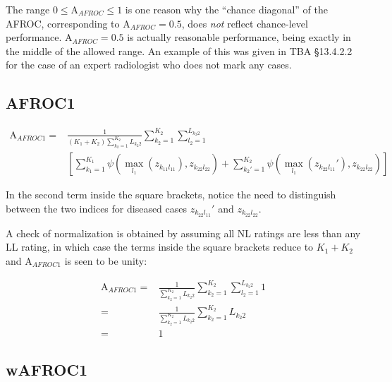\documentclass[
]{book}
\begin{document}
The range \(0 \leq \text{A}_{AFROC} \leq 1\) is one reason why the ``chance diagonal'' of the AFROC, corresponding to \(\text{A}_{AFROC} = 0.5\), does \emph{not} reflect chance-level performance. \(\text{A}_{AFROC} = 0.5\) is actually reasonable performance, being exactly in the middle of the allowed range. An example of this was given in TBA §13.4.2.2 for the case of an expert radiologist who does not mark any cases.

\hypertarget{afroc1}{%
\subsection{AFROC1}\label{afroc1}}

\begin{equation}
\begin{aligned}
\text{A}_{AFROC1} =& \frac{1}{\left (K_1 +K_2 \right )\sum_{k_2=1}^{K_2}L_{k_2 2}}\sum_{k_2=1}^{K_2}\sum_{l_2=1}^{L_{k_2 2}} \\
& \left[ \sum_{k_1=1}^{K_1}\psi\left ( \max_{l_1}\left (z_{k_11l_11}  \right ),z_{k_22l_22} \right ) + \sum_{k_2'=1}^{K_2}\psi\left ( \max_{l_1}\left (z_{k_22l_11}'  \right ),z_{k_22l_22} \right )  \right ]
\end{aligned}
\label{eq:empirical-computational-afroc1}
\end{equation}

In the second term inside the square brackets, notice the need to distinguish between the two indices for diseased cases \(z_{k_22l_11}'\) and \(z_{k_22l_22}\).

A check of normalization is obtained by assuming all NL ratings are less than any LL rating, in which case the terms inside the square brackets reduce to \(K_1+K_2\) and \(\text{A}_{AFROC1}\) is seen to be unity:

\begin{equation}
\begin{aligned}
\text{A}_{AFROC1} =& \frac{1}{\sum_{k_2=1}^{K_2}L_{k_2 2}}\sum_{k_2=1}^{K_2}\sum_{l_2=1}^{L_{k_2 2}} 1 \\
=& \frac{1}{\sum_{k_2=1}^{K_2}L_{k_2 2}}\sum_{k_2=1}^{K_2}L_{k_2 2} \\
=& 1
\end{aligned}
\label{eq:empirical-computational-afroc1a}
\end{equation}

\hypertarget{wafroc1}{%
\subsection{wAFROC1}\label{wafroc1}}
\end{document}
